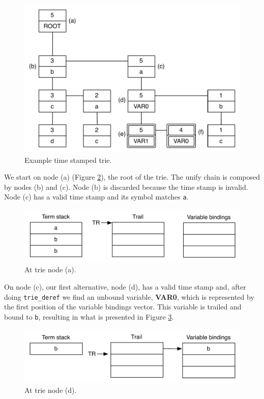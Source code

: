 \begin{figure}[H]
  \centering
    \includegraphics[scale=0.6]{collect_example_1.pdf}
  \caption{Example time stamped trie.}
  \label{fig:collect_example_1}
\end{figure}

We start on node (a) (Figure \ref{fig:collect_ex1}), the root of the trie. The unify chain
is composed by nodes (b) and (c). Node (b) is discarded because the time stamp is invalid.
Node (c) has a valid time stamp and its symbol matches \texttt{a}.

\begin{figure}[H]
  \centering
    \includegraphics[scale=0.6]{collect_ex1.pdf}
  \caption{At trie node (a).}
  \label{fig:collect_ex1}
\end{figure}

On node (c), our first alternative, node (d), has a valid time stamp and, after doing
\texttt{trie\_deref} we find an unbound variable, \textbf{VAR0}, which is represented
by the first position of the variable bindings vector.
This variable is trailed and bound to \texttt{b},
resulting in what is presented in Figure \ref{fig:collect_ex2}.

\begin{figure}[H]
  \centering
    \includegraphics[scale=0.6]{collect_ex2.pdf}
  \caption{At trie node (d).}
  \label{fig:collect_ex2}
\end{figure}

